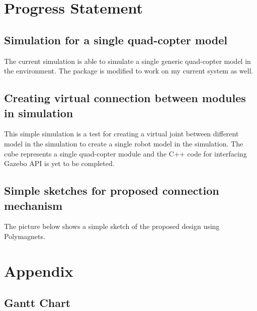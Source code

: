 \documentclass[12pt,A4]{article}
\begin{document}
	\section{Progress Statement}
	
	\subsection{Simulation for a single quad-copter model}
	
	The current simulation is able to simulate a single generic quad-copter model in the environment. The package is modified to work on my current system as well.

	
	\subsection{Creating virtual connection between modules in simulation}
	
	This simple simulation is a test for creating a virtual joint between different model in the simulation to create a single robot model in the simulation. The cube represents a single quad-copter module and the C++ code for interfacing Gazebo API is yet to be completed.
	
	
	\subsection{Simple sketches for proposed connection mechanism}
	
	The picture below shows a simple sketch of the proposed design using Polymagnets.
	
	
	\pagebreak

	\section{Appendix}
	\subsection{Gantt Chart}
	
	
	
	\pagebreak



\end{document}
